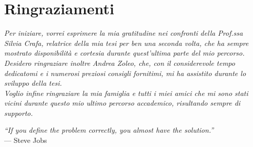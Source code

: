 
{}
{}




\bigskip

\begingroup
\let\clearpage\relax
\let\cleardoublepage\relax
\let\cleardoublepage\relax

\chapter*{Ringraziamenti}
\noindent \textit{Per iniziare, vorrei esprimere la mia gratitudine nei confronti della Prof.ssa Silvia Crafa, relatrice della mia tesi per ben una seconda volta, che ha sempre mostrato disponibilità e cortesia durante quest'ultima parte del mio percorso.}\\

\noindent \textit{Desidero ringraziare inoltre Andrea Zoleo, che, con il considerevole tempo dedicatomi e i numerosi preziosi consigli fornitimi, mi ha assistito durante lo sviluppo della tesi.}\\

\noindent \textit{Voglio infine ringraziare la mia famiglia e tutti i miei amici che mi sono stati vicini durante questo mio ultimo percorso accademico, risultando sempre di supporto.}\\



\begin{flushright}{
	\slshape    
	``If you define the problem correctly, you almost have the solution.''} \\ 
	\medskip
    --- Steve Jobs
\end{flushright}

\endgroup

